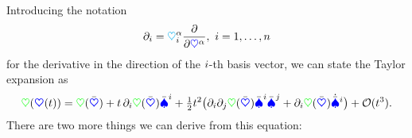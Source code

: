 Introducing the notation
\begin{align}\label{eq:DefBasisDiff}
 \partial_{i} = \textcolor{cyan}{\heartsuit}^{\alpha}_{i} \frac{\partial }{\partial \textcolor{blue}{\heartsuit}^{\alpha}}, \ i = 1,\ldots,n
\end{align}
for the derivative in the direction of the $i$-th basis vector, we can state the Taylor expansion as
\begin{align}
 \textcolor{green}{\heartsuit}(\boldsymbol{\textcolor{blue}{\heartsuit}}(t)) = \textcolor{green}{\heartsuit}(\bar{\boldsymbol{\textcolor{blue}{\heartsuit}}})
  + t \, \partial_{i} \textcolor{green}{\heartsuit}(\bar{\boldsymbol{\textcolor{blue}{\heartsuit}}}) \bar{\textcolor{blue}{\spadesuit}}^{i}
  + \tfrac{1}{2} t^2 \big( \partial_{i} \partial_{j} \textcolor{green}{\heartsuit}(\bar{\boldsymbol{\textcolor{blue}{\heartsuit}}}) \bar{\textcolor{blue}{\spadesuit}}^{i} \bar{\textcolor{blue}{\spadesuit}}^{j} + \partial_{i} \textcolor{green}{\heartsuit}(\bar{\boldsymbol{\textcolor{blue}{\heartsuit}}}) \dot{\bar{\textcolor{blue}{\spadesuit}}}^{i} \big)
  + \mathcal{O}(t^3).
\label{eq:TaylorExpansionOne}
\end{align}
There are two more things we can derive from this equation:

